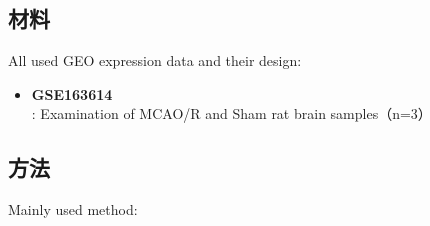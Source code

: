\documentclass[
]{article}
\providecommand{\tightlist}{%
  \setlength{\itemsep}{0pt}\setlength{\parskip}{0pt}}
\begin{document}
\hypertarget{ux6750ux6599}{%
\subsection{材料}\label{ux6750ux6599}}

All used GEO expression data and their design:

\begin{itemize}
\tightlist
\item
  \textbf{GSE163614}: Examination of MCAO/R and Sham rat brain samples（n=3）
\end{itemize}

\hypertarget{ux65b9ux6cd5}{%
\subsection{方法}\label{ux65b9ux6cd5}}

Mainly used method:
\end{document}
